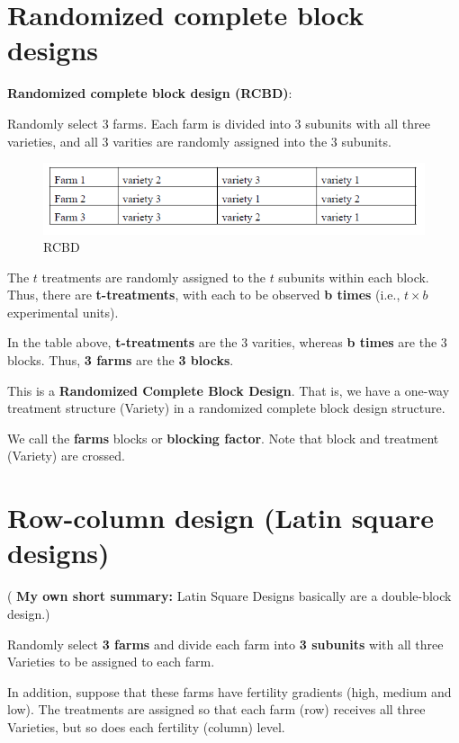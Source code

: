 \documentclass[]{book}
\begin{document}
\hypertarget{randomized-complete-block-designs}{%
\section{Randomized complete block designs}\label{randomized-complete-block-designs}}

\textbf{Randomized complete block design (RCBD)}:

Randomly select 3 farms. Each farm is divided into 3 subunits with all three varieties, and all 3 varities are randomly assigned into the 3 subunits.

\begin{figure}
\centering
\includegraphics{RCBD.png}
\caption{RCBD}
\end{figure}

The \(t\) treatments are randomly assigned to the \(t\) subunits within each block. Thus, there are \textbf{t-treatments}, with each to be observed \textbf{b times} (i.e., \(t \times b\) experimental units).

In the table above, \textbf{t-treatments} are the 3 varities, whereas \textbf{b times} are the 3 blocks. Thus, \textbf{3 farms} are the \textbf{3 blocks}.

This is a \textbf{Randomized Complete Block Design}. That is, we have a one-way treatment structure (Variety) in a randomized complete block design structure.

We call the \textbf{farms} blocks or \textbf{blocking factor}. Note that block and treatment (Variety) are crossed.

\hypertarget{row-column-design-latin-square-designs}{%
\section{Row-column design (Latin square designs)}\label{row-column-design-latin-square-designs}}

( \textbf{My own short summary:} Latin Square Designs basically are a double-block design.)

Randomly select \textbf{3 farms} and divide each farm into \textbf{3 subunits} with all three Varieties to be assigned to each farm.

In addition, suppose that these farms have fertility gradients (high, medium and low). The treatments are assigned so that each farm (row) receives all three Varieties, but so does each fertility (column) level.
\end{document}
